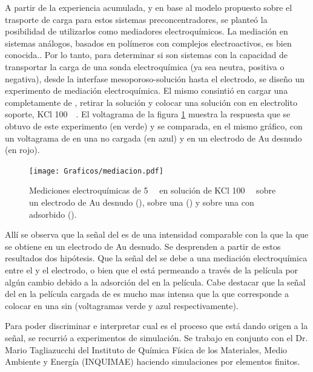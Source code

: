 		A partir de la experiencia acumulada, y en base al modelo propuesto sobre el trasporte de carga para estos sistemas preconcentradores, se planteó la posibilidad de utilizarlos como mediadores electroquímicos. 
    	La mediación en sistemas análogos, basados en polímeros con complejos electroactivos, es bien conocida.\cite{Kolb1993,Ybarra2005}. Por lo tanto, para determinar si son sistemas con la capacidad de transportar la carga de una sonda electroquímica (ya sea neutra, positiva o negativa), desde la interfase mesoporoso-solución hasta el electrodo, se diseño un experimento de mediación electroquímica. El mismo consintió en cargar una \pdmF\space completamente de \ru, retirar la solución y colocar una solución con \fc\space en electrolito soporte, KCl \SI{100}{\milli\Molar}. El voltagrama de la figura \ref{fig:mediacion} muestra la respuesta que se obtuvo de este experimento (en verde) y se comparada, en el mismo gráfico, con un voltagrama de \fc\space en una \pdmF\space no cargada (en azul) y en un electrodo de Au desnudo (en rojo).  

        	\begin{figure}[ht]	
					\centering
			 	    \texttt{[image: Graficos/mediacion.pdf]}
			        \caption[Voltagrama de \ru\space y \fc.]{Mediciones electroquímicas de \fc\space \SI{5}{\milli\Molar} en solución de KCl \SI{100}{\milli\Molar} sobre un electrodo de Au desnudo (\usebox{\rojo}), sobre una \pdmF\space (\usebox{\azul}) y sobre una \pdmF\space con \ru\space adsorbido (\usebox{\verde}).}
			        \label{fig:mediacion}
			      	\end{figure}

		Allí se observa que la señal del \fc\space es de una intensidad comparable con la que la que se obtiene en un electrodo de Au desnudo. Se desprenden a partir de estos resultados dos hipótesis. Que la señal del \fc\space se debe a una mediación electroquímica entre el \ru\space y el electrodo, o bien que el \fc\space está permeando a través de la película por algún cambio debido a la adsorción del \ru\space en la película. Cabe destacar que la señal del \fc\space en la película cargada de \ru\space es mucho mas intensa que la que corresponde a colocar \fc\space en una \pdmF\space sin \ru (voltagramas verde y azul respectivamente).

		Para poder discriminar e interpretar cual es el proceso que está dando origen a la señal, se recurrió a experimentos de simulación. Se trabajo en conjunto con el Dr. Mario Tagliazucchi del Instituto de Química Física de los Materiales, Medio Ambiente y Energía (INQUIMAE) haciendo simulaciones por elementos finitos.

